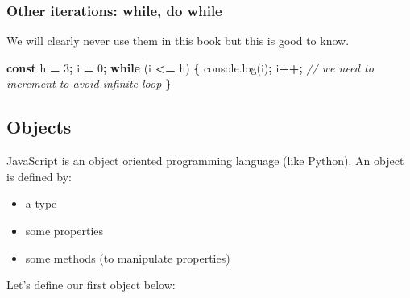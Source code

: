 \documentclass[]{book}
\newenvironment{Shaded}{\begin{snugshade}}{\end{snugshade}}
\newcommand{\AttributeTok}[1]{\textcolor[rgb]{0.77,0.63,0.00}{#1}}
\newcommand{\CommentTok}[1]{\textcolor[rgb]{0.56,0.35,0.01}{\textit{#1}}}
\newcommand{\ControlFlowTok}[1]{\textcolor[rgb]{0.13,0.29,0.53}{\textbf{#1}}}
\newcommand{\DecValTok}[1]{\textcolor[rgb]{0.00,0.00,0.81}{#1}}
\newcommand{\KeywordTok}[1]{\textcolor[rgb]{0.13,0.29,0.53}{\textbf{#1}}}
\newcommand{\NormalTok}[1]{#1}
\newcommand{\OperatorTok}[1]{\textcolor[rgb]{0.81,0.36,0.00}{\textbf{#1}}}
\newcommand{\VariableTok}[1]{\textcolor[rgb]{0.00,0.00,0.00}{#1}}
\providecommand{\tightlist}{%
  \setlength{\itemsep}{0pt}\setlength{\parskip}{0pt}}
\begin{document}
\hypertarget{other-iterations-while-do-while}{%
\subsubsection{Other iterations: while, do while}\label{other-iterations-while-do-while}}

We will clearly never use them in this book but this is good to know.

\begin{Shaded}
\begin{Highlighting}[]
\KeywordTok{const}\NormalTok{ h }\OperatorTok{=} \DecValTok{3}\OperatorTok{;}\NormalTok{ i }\OperatorTok{=} \DecValTok{0}\OperatorTok{;}
\ControlFlowTok{while}\NormalTok{ (i }\OperatorTok{<=}\NormalTok{ h) }\OperatorTok{\{}
  \VariableTok{console}\NormalTok{.}\AttributeTok{log}\NormalTok{(i)}\OperatorTok{;}
\NormalTok{  i}\OperatorTok{++;} \CommentTok{// we need to increment to avoid infinite loop}
\OperatorTok{\}}
\end{Highlighting}
\end{Shaded}

\hypertarget{objects}{%
\subsection{Objects}\label{objects}}

JavaScript is an object oriented programming language (like Python). An object is defined by:

\begin{itemize}
\tightlist
\item
  a type
\item
  some properties
\item
  some methods (to manipulate properties)
\end{itemize}

Let's define our first object below:
\end{document}
